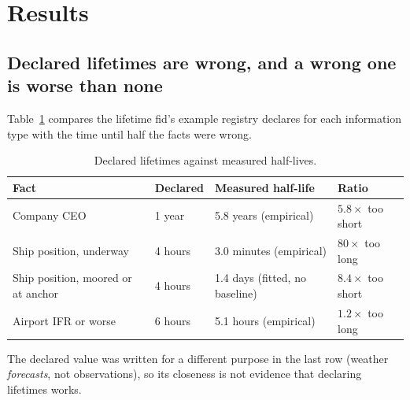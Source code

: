 
\section{Results}\label{sec:results}

\subsection{Declared lifetimes are wrong, and a wrong one is worse than none}\label{sec:results-declared}

Table~\ref{tab:declared} compares the lifetime fid's example registry
declares for each information type with the time until half the facts were
wrong.

\begin{table}[t]
\centering
\small
\caption{Declared lifetimes against measured half-lives.}
\label{tab:declared}
\begin{tabular}{llll}
\toprule
Fact & Declared & Measured half-life & Ratio \\
\midrule
Company CEO & 1 year & 5.8 years (empirical) & $5.8\times$ too short \\
Ship position, underway & 4 hours & 3.0 minutes (empirical) & $80\times$ too long \\
Ship position, moored or at anchor & 4 hours & 1.4 days (fitted, no baseline) & $8.4\times$ too short \\
Airport IFR or worse & 6 hours & 5.1 hours (empirical) & $1.2\times$ too long \\
\bottomrule
\end{tabular}
\end{table}

The declared value was written for a different purpose in the last row
(weather \emph{forecasts}, not observations), so its closeness is not
evidence that declaring lifetimes works.

